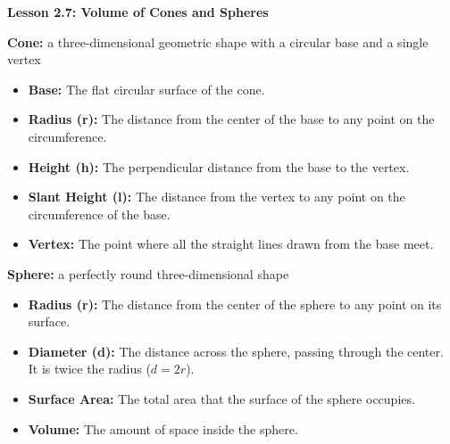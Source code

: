  \begin{center}
\textbf{Lesson 2.7: Volume of Cones and Spheres}
\end{center}

\vspace*{-1ex}

\noindent\textbf{Cone:} a three-dimensional geometric shape with a circular base and a single vertex
\begin{itemize}[noitemsep]
    \item \textbf{Base:} The flat circular surface of the cone.
    \item \textbf{Radius (r):} The distance from the center of the base to any point on the circumference.
    \item \textbf{Height (h):} The perpendicular distance from the base to the vertex.
    \item \textbf{Slant Height (l):} The distance from the vertex to any point on the circumference of the base.
    \item \textbf{Vertex:} The point where all the straight lines drawn from the base meet.
\end{itemize}

\noindent\textbf{Sphere:} a perfectly round three-dimensional shape
\begin{itemize}
    \item \textbf{Radius (r):} The distance from the center of the sphere to any point on its surface.
    \item \textbf{Diameter (d):} The distance across the sphere, passing through the center. It is twice the radius (\(d = 2r\)).
    \item \textbf{Surface Area:} The total area that the surface of the sphere occupies.
    \item \textbf{Volume:} The amount of space inside the sphere.
\end{itemize}





